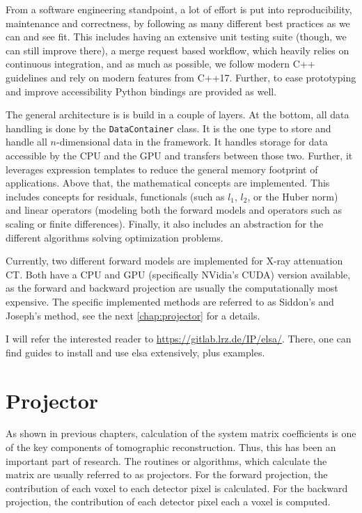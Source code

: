 From a software engineering standpoint, a lot of effort is put into reproducibility, maintenance and
correctness, by following as many different best practices as we can and see fit. This includes
having an extensive unit testing suite (though, we can still improve there), a merge request based
workflow, which heavily relies on continuous integration, and as much as possible, we follow modern
C++ guidelines and rely on modern features from C++17. Further, to ease prototyping and improve
accessibility Python bindings are provided as well.

The general architecture is is build in a couple of layers. At the bottom, all data handling is done
by the \texttt{DataContainer} class. It is the one type to store and handle all
\(n\)-dimensional data in the framework. It handles storage for data accessible by the \gls{CPU} and
the \gls{GPU} and transfers between those two. Further, it leverages expression templates to reduce
the general memory footprint of applications. Above that, the mathematical concepts are implemented.
This includes concepts for residuals, functionals (such as \(l_1\), \(l_2\), or the Huber norm) and
linear operators (modeling both the forward models and operators such as scaling or finite
differences). Finally, it also includes an abstraction for the different algorithms solving
optimization problems.

Currently, two different forward models are implemented for X-ray attenuation CT. Both have a
\gls{CPU} and \gls{GPU} (specifically NVidia's CUDA) version available, as the forward and backward
projection are usually the computationally most expensive. The specific implemented methods are
referred to as Siddon's and Joseph's method, see the next \autoref{chap:projector} for a details.

I will refer the interested reader to
\href{https://gitlab.lrz.de/IP/elsa/}{https://gitlab.lrz.de/IP/elsa/}. There, one can find guides to
install and use elsa extensively, plus examples.

\chapter{Projector}\label{chap:projector}

As shown in previous chapters, calculation of the system matrix coefficients is one of the key
components of tomographic reconstruction. Thus, this has been an important part of research. The
routines or algorithms, which calculate the matrix are usually referred to as projectors. For the
forward projection, the contribution of each voxel to each detector pixel is calculated. For the
backward projection, the contribution of each detector pixel each a voxel is computed.

